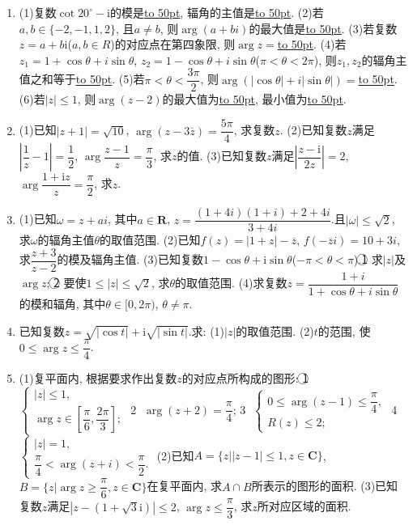 \documentclass[10pt,a4paper]{article}
\newcommand{\blank}[1]{\underline{\hbox to #1pt{}}}
\begin{document}
\begin{enumerate}[1.]
\item (1)复数$\cot 20^\circ -\mathrm{i}$的模是\blank{50}, 辐角的主值是\blank{50}.
(2)若$a,b\in \{-2,-1,1,2\}$, 且$a\ne b$, 则$\arg (a+bi)$的最大值是\blank{50}.
(3)若复数$z=a+b\mathrm{i}$($a,b\in R$)的对应点在第四象限, 则$\arg z=$\blank{50}.
(4)若$z_1=1+\cos \theta +i\sin \theta$, $z_2=1-\cos \theta +i\sin \theta$($\pi <\theta <2\pi$), 则$z_1,z_2$的辐角主值之和等于\blank{50}.
(5)若$\pi <\theta <\dfrac{3\pi }2$, 则$\arg (|\cos \theta|+i|\sin \theta|)=$\blank{50}.
(6)若$|z|\le 1$, 则$\arg (z-2)$的最大值为\blank{50}, 最小值为\blank{50}.
\item (1)已知$|z+1|=\sqrt {10}$, $\arg (z-3\overline z)=\dfrac{5\pi }4$, 求复数$z$.
(2)已知复数$z$满足$|\dfrac 1z-1|=\dfrac 12$, $\arg \dfrac{z-1}z=\dfrac{\pi }3$, 求$z$的值.
(3)已知复数$z$满足$|\dfrac{z-\mathrm{i}}{2z}|=2$, $\arg \dfrac{1+\mathrm{i}z}z=\dfrac{\pi }2$, 求$z$.
\item (1)已知$\omega =z+ai$, 其中$a\in \mathbf{R}$, $z=\dfrac{(1+4i)(1+i)+2+4i}{3+4i}$.且$|\omega|\le \sqrt 2$, 求$\omega$的辐角主值$\theta$的取值范围.
(2)已知$f(z)=|1+z|-\overline z$, $f(-\overline zi)=10+3i$, 求$\dfrac{z+3}{z-2}$的模及辐角主值.
(3)已知复数$1-\cos \theta +\mathrm{i}\sin \theta$($-\pi <\theta <\pi$).\textcircled{1} 求$|z|$及$\arg z$; \textcircled{2} 要使$1\le|z|\le \sqrt 2$, 求$\theta$的取值范围.
(4)求复数$z=\dfrac{1+i}{1+\cos \theta +i\sin \theta }$的模和辐角, 其中$\theta \in [0,2\pi)$, $\theta \ne \pi$.
\item 已知复数$z=\sqrt {|\cos t|}+\mathrm{i}\sqrt {|\sin t|}$.求:
(1)$|z|$的取值范围.
(2)$t$的范围, 使$0\le \arg z\le \dfrac{\pi }4$.
\item (1)复平面内, 根据要求作出复数$z$的对应点所构成的图形:
\textcircled{1} $\begin{cases}|z|\le 1, \\ \arg z\in [\dfrac{\pi }6,\dfrac{2\pi }3]; \end{cases}$					\textcircled{2} $\arg (z+2)=\dfrac{\pi }4$;
\textcircled{3} $\begin{cases} 0\le \arg (z-1)\le \dfrac{\pi }4, \\ R(z)\le 2; \end{cases}$				\textcircled{4} $\begin{cases}|z|=1, \\ \dfrac{\pi }4<\arg (z+i)<\dfrac{\pi }2. \end{cases}$
(2)已知$A=\{z||z-1|\le 1,z\in \mathbf{C}\}$, $B=\{z|\arg z\ge \dfrac{\pi }6,z\in \mathbf{C}\}$在复平面内, 求$A\cap B$所表示的图形的面积.
(3)已知复数$z$满足$|z-(1+\sqrt 3\mathrm{i})|\le 2$, $\arg z\le \dfrac{\pi }3$, 求$z$所对应区域的面积.

\end{enumerate}
\end{document}
